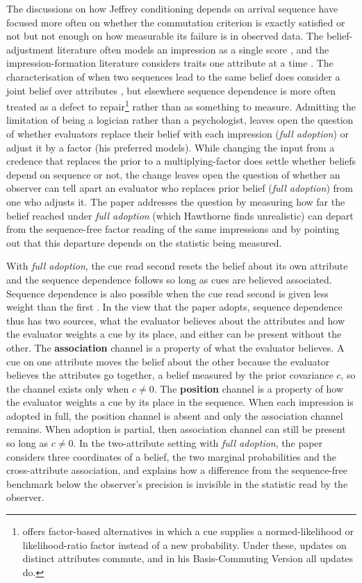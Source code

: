 \documentclass[a4paper,fleqn]{cas-sc}
\theoremstyle{remark}
\theoremstyle{definition}
\begin{document}
The discussions on how Jeffrey conditioning \citep{Jeffrey1983} depends on arrival sequence have focused more often on whether the commutation criterion is exactly satisfied or not but not enough on how measurable its failure is in observed data. The belief-adjustment literature often models an impression as a single score \citep{HogarthEinhorn1992}, and the impression-formation literature considers traits one attribute at a time \citep{Asch1946}. The characterisation of when two sequences lead to the same belief does consider a joint belief over attributes \citep{DiaconisZabell1982}, but elsewhere sequence dependence is more often treated as a defect to repair\footnote{\citet{Hawthorne2004} offers factor-based alternatives in which a cue supplies a normed-likelihood or likelihood-ratio factor instead of a new probability. Under these, updates on distinct attributes commute, and in his Basis-Commuting Version all updates do.} rather than as something to measure. Admitting the limitation of being a logician rather than a psychologist, \citet{Hawthorne2004} leaves open the question of whether evaluators replace their belief with each impression (\emph{full adoption})
or adjust it by a factor (his preferred models). While changing the input from a credence that replaces the prior to a multiplying-factor does settle whether beliefs depend on sequence or not, the change leaves open the question of whether an observer can tell apart an evaluator who replaces prior belief (\emph{full adoption}) from one who adjusts it. The paper addresses the question by measuring how far the belief reached under \emph{full adoption} (which Hawthorne finds unrealistic) can depart from the sequence-free factor reading of the same impressions and by pointing out that this departure depends on the statistic being measured.

With \emph{full adoption}, the cue read second resets the belief about its own attribute and the sequence dependence follows so long as cues are believed associated. Sequence dependence is also possible when the cue read second is given less weight than the first \citep{HogarthEinhorn1992}. In the view that the paper adopts, sequence dependence thus has two sources, what the evaluator believes about the attributes and how the evaluator weights a cue by its place, and either can be present without the other. The \textbf{association} channel is a property of what the evaluator believes. A cue on one attribute moves the belief about the other because the evaluator believes the attributes go together, a belief
measured by the prior covariance $c$, so the channel exists only when $c\neq0$. The \textbf{position} channel is a property of how the evaluator weights a cue by its place in the sequence. When each impression is adopted
in full, the position channel is absent and only the association channel remains. When adoption is partial, then association channel can still be present so long as $ c \neq 0 $. In the two-attribute setting with \emph{full adoption}, the paper considers three coordinates of a belief, the two marginal probabilities and the cross-attribute association, and explains how a
difference from the sequence-free benchmark below the observer's precision is invisible in the statistic read by the observer.
\end{document}
